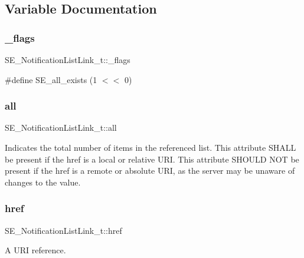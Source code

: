 \subsection{Variable Documentation}
\mbox{\label{group__NotificationListLink_ga5023938637f32b603975b8a403a27bee}} 
\subsubsection{\texorpdfstring{\+\_\+flags}{\_flags}}
{\footnotesize\ttfamily S\+E\+\_\+\+Notification\+List\+Link\+\_\+t\+::\+\_\+flags}

\#define S\+E\+\_\+all\+\_\+exists (1 $<$$<$ 0) \mbox{\label{group__NotificationListLink_ga313276d3b11f3056bd8e5ec14bcc3b12}} 
\subsubsection{\texorpdfstring{all}{all}}
{\footnotesize\ttfamily S\+E\+\_\+\+Notification\+List\+Link\+\_\+t\+::all}

Indicates the total number of items in the referenced list. This attribute S\+H\+A\+LL be present if the href is a local or relative U\+RI. This attribute S\+H\+O\+U\+LD N\+OT be present if the href is a remote or absolute U\+RI, as the server may be unaware of changes to the value. \mbox{\label{group__NotificationListLink_ga5813d265b0bfb7682fca2205bd5ad8a5}} 
\subsubsection{\texorpdfstring{href}{href}}
{\footnotesize\ttfamily S\+E\+\_\+\+Notification\+List\+Link\+\_\+t\+::href}

A U\+RI reference. 